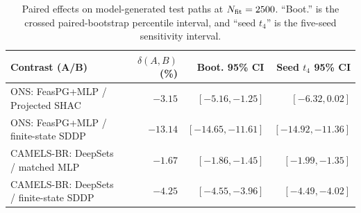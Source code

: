 \begin{table}[!htbp]
\caption{Paired effects on model-generated test paths at \(N_{\rm fit}=2500\).
``Boot.'' is the crossed paired-bootstrap percentile interval, and ``seed
\(t_4\)'' is the five-seed sensitivity interval.}
\label{tab:real-paired-ci}
\centering
\scriptsize
\setlength{\tabcolsep}{3.2pt}
\begin{tabular}{@{}lrrr@{}}
\toprule
Contrast (A/B) & \(\delta(A,B)\) (\%) & Boot. 95\% CI & Seed \(t_4\) 95\% CI\\
\midrule
ONS: FeasPG+MLP / Projected SHAC & $-3.15$ & $[-5.16,-1.25]$ & $[-6.32,0.02]$\\
ONS: FeasPG+MLP / finite-state SDDP & $-13.14$ & $[-14.65,-11.61]$ & $[-14.92,-11.36]$\\
CAMELS-BR: DeepSets / matched MLP & $-1.67$ & $[-1.86,-1.45]$ & $[-1.99,-1.35]$\\
CAMELS-BR: DeepSets / finite-state SDDP & $-4.25$ & $[-4.55,-3.96]$ & $[-4.49,-4.02]$\\
\bottomrule
\end{tabular}
\end{table}
